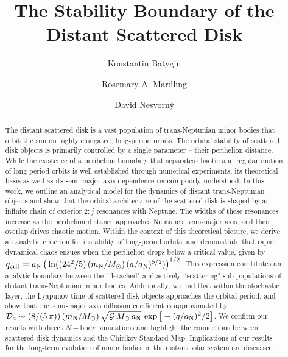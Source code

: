 \documentclass[twocolumn]{aastex62}
\newcommand{\G}{\mathcal{G}}
\newcommand{\Msun}{M_{\odot}}
\newcommand{\mn}{m_{\rm{N}}}
\newcommand{\an}{a_{\rm{N}}}
\begin{document}

\title{The Stability Boundary of the Distant Scattered Disk}

\author{Konstantin Batygin}

\author{Rosemary A. Mardling}

\author{David Nesvorn{\'y}}

\begin{abstract}
The distant scattered disk is a vast population of trans-Neptunian minor bodies that orbit the sun on highly elongated, long-period orbits. The orbital stability of scattered disk objects is primarily controlled by a single parameter -- their perihelion distance. While the existence of a perihelion boundary that separates chaotic and regular motion of long-period orbits is well established through numerical experiments, its theoretical basis as well as its semi-major axis dependence remain poorly understood. In this work, we outline an analytical model for the dynamics of distant trans-Neptunian objects and show that the orbital architecture of the scattered disk is shaped by an infinite chain of exterior $2:j$ resonances with Neptune. The widths of these resonances increase as the perihelion distance approaches Neptune's semi-major axis, and their overlap drives chaotic motion. Within the context of this theoretical picture, we derive an analytic criterion for instability of long-period orbits, and demonstrate that rapid dynamical chaos ensues when the perihelion drops below a critical value, given by $q_{\rm{crit}}=\an\,\big(\ln((24^2/5)\,(\mn/\Msun)\,(a/\an)^{5/2})\big)^{1/2}$. This expression constitutes an analytic boundary between the ``detached" and actively ``scattering" sub-populations of distant trans-Neptunian minor bodies. Additionally, we find that within the stochastic layer, the Lyapunov time of scattered disk objects approaches the orbital period, and show that the semi-major axis diffusion coefficient is approximated by $\mathcal{D}_a\sim(8/(5\,\pi))\,(\mn/\Msun)\,\sqrt{\G\,\Msun\,\an}\,\exp\big[-(q/\an)^2/2\big]$. We confirm our results with direct $N-$body simulations and highlight the connections between scattered disk dynamics and the Chirikov Standard Map. Implications of our results for the long-term evolution of minor bodies in the distant solar system are discussed.
\end{abstract}
\end{document}
